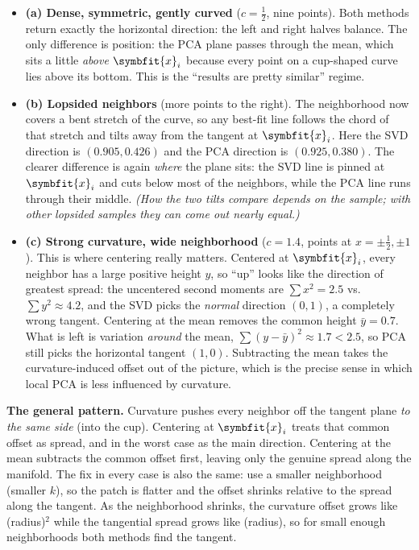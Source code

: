 \documentclass[11pt]{article}
\newcommand{\bm}[1]{\symbfit{#1}}
\newcommand{\vx}{\bm{x}}
\begin{document}
\begin{itemize}
\item \textbf{(a) Dense, symmetric, gently curved} ($c=\tfrac12$, nine points). Both methods return exactly the horizontal direction:
the left and right halves balance. The only difference is position: the PCA plane passes through the mean, which sits a
little \emph{above} $\vx_i$ because every point on a cup-shaped curve lies above its bottom. This is the ``results are
pretty similar'' regime.
\item \textbf{(b) Lopsided neighbors} (more points to the right). The neighborhood now covers a bent stretch of the curve, so
any best-fit line follows the chord of that stretch and tilts away from the tangent at $\vx_i$. Here the SVD direction is
$(0.905,0.426)$ and the PCA direction is $(0.925,0.380)$. The clearer difference is again \emph{where} the plane sits: the SVD
line is pinned at $\vx_i$ and cuts below most of the neighbors, while the PCA line runs through their middle.
\emph{(How the two tilts compare depends on the sample; with other lopsided samples they can come out nearly equal.)}
\item \textbf{(c) Strong curvature, wide neighborhood} ($c=1.4$, points at $x=\pm\tfrac12,\pm1$). This is where centering really matters. Centered
at $\vx_i$, every neighbor has a large positive height $y$, so ``up'' looks like the direction of greatest spread: the
uncentered second moments are $\sum x^2=2.5$ vs.\ $\sum y^2\approx4.2$, and the SVD picks the \emph{normal} direction $(0,1)$, a completely
wrong tangent. Centering at the mean removes the common height $\bar y=0.7$. What is left is variation \emph{around} the mean,
$\sum(y-\bar y)^2\approx1.7<2.5$, so PCA still picks the horizontal tangent $(1,0)$. Subtracting the mean takes the curvature-induced
offset out of the picture, which is the precise sense in which local PCA is less influenced by curvature.
\end{itemize}

\begin{intuition}
\textbf{The general pattern.} Curvature pushes every neighbor off the tangent plane \emph{to the same side} (into the cup).
Centering at $\vx_i$ treats that common offset as spread, and in the worst case as the main direction. Centering at the
mean subtracts the common offset first, leaving only the genuine spread along the manifold. The fix in every case is
also the same: use a smaller neighborhood (smaller $k$), so the patch is flatter and the offset shrinks relative to the
spread along the tangent. As the neighborhood shrinks, the curvature offset grows like (radius)$^2$ while the tangential spread
grows like (radius), so for small enough neighborhoods both methods find the tangent.
\end{intuition}
\end{document}

